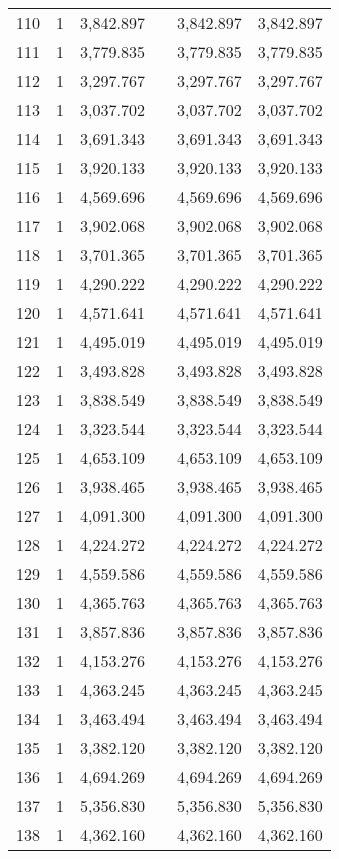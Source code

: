 \begin{table}[!htbp]
\begin{tabular}{@{\extracolsep{5pt}}lccccc}
110 & 1 & 3,842.897 &  & 3,842.897 & 3,842.897 \\ 
111 & 1 & 3,779.835 &  & 3,779.835 & 3,779.835 \\ 
112 & 1 & 3,297.767 &  & 3,297.767 & 3,297.767 \\ 
113 & 1 & 3,037.702 &  & 3,037.702 & 3,037.702 \\ 
114 & 1 & 3,691.343 &  & 3,691.343 & 3,691.343 \\ 
115 & 1 & 3,920.133 &  & 3,920.133 & 3,920.133 \\ 
116 & 1 & 4,569.696 &  & 4,569.696 & 4,569.696 \\ 
117 & 1 & 3,902.068 &  & 3,902.068 & 3,902.068 \\ 
118 & 1 & 3,701.365 &  & 3,701.365 & 3,701.365 \\ 
119 & 1 & 4,290.222 &  & 4,290.222 & 4,290.222 \\ 
120 & 1 & 4,571.641 &  & 4,571.641 & 4,571.641 \\ 
121 & 1 & 4,495.019 &  & 4,495.019 & 4,495.019 \\ 
122 & 1 & 3,493.828 &  & 3,493.828 & 3,493.828 \\ 
123 & 1 & 3,838.549 &  & 3,838.549 & 3,838.549 \\ 
124 & 1 & 3,323.544 &  & 3,323.544 & 3,323.544 \\ 
125 & 1 & 4,653.109 &  & 4,653.109 & 4,653.109 \\ 
126 & 1 & 3,938.465 &  & 3,938.465 & 3,938.465 \\ 
127 & 1 & 4,091.300 &  & 4,091.300 & 4,091.300 \\ 
128 & 1 & 4,224.272 &  & 4,224.272 & 4,224.272 \\ 
129 & 1 & 4,559.586 &  & 4,559.586 & 4,559.586 \\ 
130 & 1 & 4,365.763 &  & 4,365.763 & 4,365.763 \\ 
131 & 1 & 3,857.836 &  & 3,857.836 & 3,857.836 \\ 
132 & 1 & 4,153.276 &  & 4,153.276 & 4,153.276 \\ 
133 & 1 & 4,363.245 &  & 4,363.245 & 4,363.245 \\ 
134 & 1 & 3,463.494 &  & 3,463.494 & 3,463.494 \\ 
135 & 1 & 3,382.120 &  & 3,382.120 & 3,382.120 \\ 
136 & 1 & 4,694.269 &  & 4,694.269 & 4,694.269 \\ 
137 & 1 & 5,356.830 &  & 5,356.830 & 5,356.830 \\ 
138 & 1 & 4,362.160 &  & 4,362.160 & 4,362.160 \\ 

\end{tabular}
\end{table}
